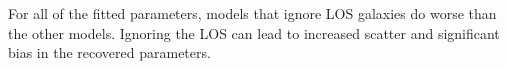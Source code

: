 For all of the fitted parameters, models that ignore LOS galaxies do worse than the other models. Ignoring the LOS can lead to increased scatter and significant bias in the recovered parameters.
